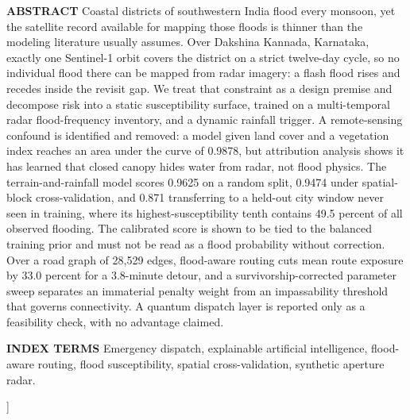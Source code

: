 \documentclass[10pt,twocolumn]{article}
\begin{document}
\begin{@twocolumnfalse}
\begin{minipage}{\dimexpr\textwidth-0.958in\relax}
{\fontsize{10}{12}\selectfont
{\helv\bfseries\color{accessblue}ABSTRACT }Coastal districts of southwestern India flood every monsoon, yet the satellite record available for mapping those floods is thinner than the modeling literature usually assumes. Over Dakshina Kannada, Karnataka, exactly one Sentinel-1 orbit covers the district on a strict twelve-day cycle, so no individual flood there can be mapped from radar imagery: a flash flood rises and recedes inside the revisit gap. We treat that constraint as a design premise and decompose risk into a static susceptibility surface, trained on a multi-temporal radar flood-frequency inventory, and a dynamic rainfall trigger. A remote-sensing confound is identified and removed: a model given land cover and a vegetation index reaches an area under the curve of 0.9878, but attribution analysis shows it has learned that closed canopy hides water from radar, not flood physics. The terrain-and-rainfall model scores 0.9625 on a random split, 0.9474 under spatial-block cross-validation, and 0.871 transferring to a held-out city window never seen in training, where its highest-susceptibility tenth contains 49.5 percent of all observed flooding. The calibrated score is shown to be tied to the balanced training prior and must not be read as a flood probability without correction. Over a road graph of 28,529 edges, flood-aware routing cuts mean route exposure by 33.0 percent for a 3.8-minute detour, and a survivorship-corrected parameter sweep separates an immaterial penalty weight from an impassability threshold that governs connectivity. A quantum dispatch layer is reported only as a feasibility check, with no advantage claimed.\par}

\vspace{9pt}

{\fontsize{10}{12}\selectfont\raggedright
{\helv\bfseries\color{accessblue}INDEX TERMS }Emergency dispatch, explainable artificial intelligence, flood-aware routing, flood susceptibility, spatial cross-validation, synthetic aperture radar.\par}
\end{minipage}

\vspace{16pt}
\end{@twocolumnfalse}
]
\end{document}
